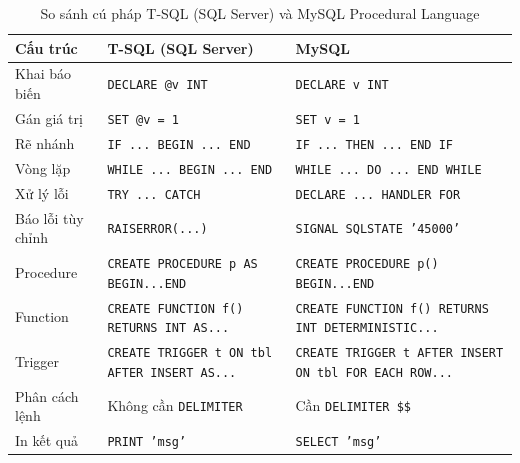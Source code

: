 \documentclass[11pt]{report}
\begin{document}
\begin{table}[H]
    \centering
    \renewcommand{\tabularxcolumn}[1]{m{#1}}
    \begin{tabularx}{\textwidth}{|l|>{\raggedright\arraybackslash}X|>{\raggedright\arraybackslash}X|} \hline
        \rowcolor{teal!30}
        \textbf{Cấu trúc} & \textbf{T-SQL (SQL Server)} & \textbf{MySQL} \\ \hline
        Khai báo biến     & \texttt{DECLARE @v INT}                             & \texttt{DECLARE v INT}              \\ \hline
        Gán giá trị       & \texttt{SET @v = 1}                                 & \texttt{SET v = 1}                  \\ \hline
        Rẽ nhánh          & \texttt{IF ... BEGIN ... END}                       & \texttt{IF ... THEN ... END IF}     \\ \hline
        Vòng lặp          & \texttt{WHILE ... BEGIN ... END}                    & \texttt{WHILE ... DO ... END WHILE} \\ \hline
        Xử lý lỗi         & \texttt{TRY ... CATCH}                              & \texttt{DECLARE ... HANDLER FOR}    \\ \hline
        Báo lỗi tùy chỉnh & \texttt{RAISERROR(...)}                             & \texttt{SIGNAL SQLSTATE '45000'}    \\ \hline
        Procedure         & \texttt{CREATE PROCEDURE p AS BEGIN...END}          & \texttt{CREATE PROCEDURE p() BEGIN...END} \\ \hline
        Function          & \texttt{CREATE FUNCTION f() RETURNS INT AS...}      & \texttt{CREATE FUNCTION f() RETURNS INT DETERMINISTIC...} \\ \hline
        Trigger           & \texttt{CREATE TRIGGER t ON tbl AFTER INSERT AS...} & \texttt{CREATE TRIGGER t AFTER INSERT ON tbl FOR EACH ROW...} \\ \hline
        Phân cách lệnh    & Không cần \texttt{DELIMITER}                        & Cần \texttt{DELIMITER \$\$}         \\ \hline
        In kết quả        & \texttt{PRINT 'msg'}                                & \texttt{SELECT 'msg'}               \\ \hline
    \end{tabularx}
    \caption{So sánh cú pháp T-SQL (SQL Server) và MySQL Procedural Language}
    \label{tab:tsql_vs_mysql}
\end{table}
\end{document}
